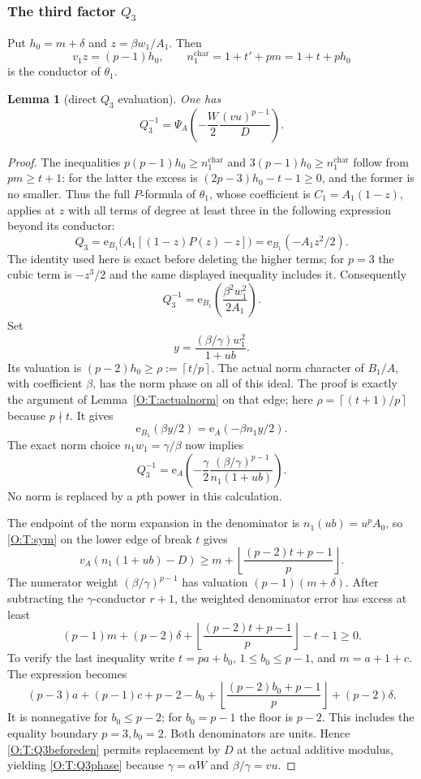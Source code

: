 \documentclass[11pt]{amsart}
\newtheorem{lemma}[theorem]{Lemma}
\theoremstyle{definition}
\theoremstyle{remark}
\newcommand{\ceil}[1]{\left\lceil #1\right\rceil}
\newcommand{\floor}[1]{\left\lfloor #1\right\rfloor}
\newcommand{\ee}{\mathrm e}\newcommand{\echar}{\mathrm e}\newcommand{\FF}{\mathbf F}
\begin{document}
\subsubsection*{The third factor $Q_3$}
Put $h_0=m+\delta$ and $z=\beta w_1/A_1$. Then
\[
 v_1z=(p-1)h_0,\qquad
 n_1^{\mathrm{char}}=1+t'+pm=1+t+ph_0
\]
is the conductor of $\theta_1$.
\begin{lemma}[direct $Q_3$ evaluation]\label{O:T:Q3}
One has
\begin{equation}\label{O:T:Q3phase}
 Q_3^{-1}=\Psi_A\left(-\frac W2\frac{(vu)^{p-1}}D\right).
\end{equation}
\end{lemma}
\begin{proof}
The inequalities $p(p-1)h_0\ge n_1^{\mathrm{char}}$ and
$3(p-1)h_0\ge n_1^{\mathrm{char}}$ follow from $pm\ge t+1$:
for the latter the excess is $(2p-3)h_0-t-1\ge0$, and the former
is no smaller. Thus the full $P$-formula of $\theta_1$, whose
coefficient is $C_1=A_1(1-z)$, applies at $z$ with all terms of
degree at least three in the following expression beyond its conductor:
\[
 Q_3=\ee_{B_1}\bigl(A_1[(1-z)P(z)-z]\bigr)
     =\ee_{B_1}(-A_1z^2/2).
\]
The identity used here is exact before deleting the higher terms;
for $p=3$ the cubic term is $-z^3/2$ and the same displayed
inequality includes it. Consequently
\[
 Q_3^{-1}=\ee_{B_1}\left(\frac{\beta^2w_1^2}{2A_1}\right).
\]
Set
\[
 y=\frac{(\beta/\gamma)w_1^2}{1+ub}.
\]
Its valuation is $(p-2)h_0\ge\rho:=\ceil{t/p}$.
The actual norm character of $B_1/A$, with coefficient $\beta$,
has the norm phase on all of this ideal. The proof is exactly the
argument of Lemma~\ref{O:T:actualnorm} on that edge; here
$\rho=\ceil{(t+1)/p}$ because $p\nmid t$.
It gives
\[
 \ee_{B_1}(\beta y/2)=\ee_A(-\beta n_1y/2).
\]
The exact norm choice $n_1w_1=\gamma/\beta$ now implies
\begin{equation}\label{O:T:Q3beforeden}
 Q_3^{-1}=\ee_A\left(-\frac\gamma2
       \frac{(\beta/\gamma)^{p-1}}{n_1(1+ub)}\right).
\end{equation}
No norm is replaced by a $p$th power in this calculation.

The endpoint of the norm expansion in the denominator is
$n_1(ub)=u^pA_0$, so \eqref{O:T:sym} on the lower edge of break $t$ gives
\[
 v_A(n_1(1+ub)-D)\ge
 m+\floor{\frac{(p-2)t+p-1}p}.
\]
The numerator weight $(\beta/\gamma)^{p-1}$ has valuation
$(p-1)(m+\delta)$. After subtracting the $\gamma$-conductor $r+1$,
the weighted denominator error has excess at least
\[
 (p-1)m+(p-2)\delta+
 \floor{\frac{(p-2)t+p-1}p}-t-1\ge0.
\]
To verify the last inequality write $t=pa+b_0$,
$1\le b_0\le p-1$, and $m=a+1+c$. The expression becomes
\[
 (p-3)a+(p-1)c+p-2-b_0+
 \floor{\frac{(p-2)b_0+p-1}p}+(p-2)\delta.
\]
It is nonnegative for $b_0\le p-2$; for $b_0=p-1$ the floor is
$p-2$. This includes the equality boundary $p=3,b_0=2$.
Both denominators are units. Hence \eqref{O:T:Q3beforeden} permits
replacement by $D$ at the actual additive modulus, yielding
\eqref{O:T:Q3phase} because $\gamma=\alpha W$ and $\beta/\gamma=vu$.
\end{proof}
\end{document}
